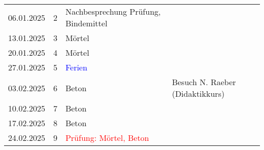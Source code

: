 \documentclass[
11pt,
captions=tableheading,
headings=big,
headsepline,
footsepline, 
captions=tableheading,
parskip=half-,
]{scrartcl}
\newcommand{\red}[1]{\textcolor{red}{#1}}
\begin{document}
\begin{table}[H]
\begin{tabular}{llp{8cm}p{4cm}}
        \midrule
        06.01.2025     & 2           & Nachbesprechung Prüfung, Bindemittel                     & {}                  \\
        13.01.2025     & 3           & Mörtel                                                   & {}                  \\
        20.01.2025     & 4           & Mörtel                                                    & {}                  \\
        \midrule
        27.01.2025     & 5           & \textcolor{blue}{Ferien}                                 & {}                  \\
        \midrule
        03.02.2025     & 6           & Beton                                                    & Besuch N. Raeber (Didaktikkurs)                  \\
        10.02.2025     & 7           & Beton                                                    & {}                  \\
        17.02.2025     & 8           & Beton                                                    & {}                  \\
        24.02.2025     & 9           & \red{Prüfung: Mörtel, Beton}                             &                     \\
        \bottomrule
    \end{tabular}
\end{table}
\end{document}
